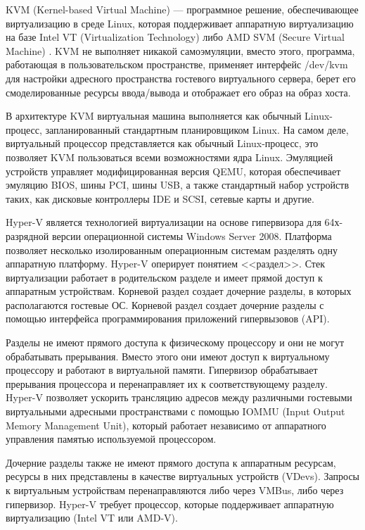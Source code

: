 KVM (Kernel-based Virtual Machine) --- программное решение, обеспечивающее виртуализацию в среде Linux, которая поддерживает аппаратную виртуализацию на базе Intel VT (Virtualization Technology) либо AMD SVM (Secure Virtual Machine) \cite{kvm-ibm}.
KVM не выполняет никакой самоэмуляции, вместо этого, программа, работающая в пользовательском пространстве, применяет интерфейс /dev/kvm для настройки адресного пространства гостевого виртуального сервера, берет его смоделированные ресурсы ввода/вывода и отображает его образ на образ хоста.

В архитектуре KVM виртуальная машина выполняется как обычный Linux-процесс, запланированный стандартным планировщиком Linux.
На самом деле, виртуальный процессор представляется как обычный Linux-процесс, это позволяет KVM пользоваться всеми возможностями ядра Linux.
Эмуляцией устройств управляет модифицированная версия QEMU, которая обеспечивает эмуляцию BIOS, шины PCI, шины USB, а также стандартный набор устройств таких, как дисковые контроллеры IDE и SCSI, сетевые карты и другие.

Hyper-V является технологией виртуализации на основе гипервизора для 64х-разрядной версии операционной системы Windows Server 2008.
Платформа позволяет несколько изолированным операционным системам разделять одну аппаратную платформу.
Hyper-V оперирует понятием <<раздел>>.
Стек виртуализации работает в родительском разделе и имеет прямой доступ к аппаратным устройствам.
Корневой раздел создает дочерние разделы, в которых располагаются гостевые ОС.
Корневой раздел создает дочерние разделы с помощью интерфейса программирования приложений гипервызовов (API).

Разделы не имеют прямого доступа к физическому процессору и они не могут обрабатывать прерывания.
Вместо этого они имеют доступ к виртуальному процессору и работают в виртуальной памяти.
Гипервизор обрабатывает прерывания процессора и перенаправляет их к соответствующему разделу.
Hyper-V позволяет ускорить трансляцию адресов между различными гостевыми виртуальными адресными пространствами с помощью IOMMU (Input Output Memory Management Unit), который работает независимо от аппаратного управления памятью используемой процессором.

Дочерние разделы также не имеют прямого доступа к аппаратным ресурсам, ресурсы в них представлены в качестве виртуальных устройств (VDevs).
Запросы к виртуальным устройствам перенаправляются либо через VMBus, либо через гипервизор.
Hyper-V требует процессор, которые поддерживает аппаратную виртуализацию (Intel VT или AMD-V).

